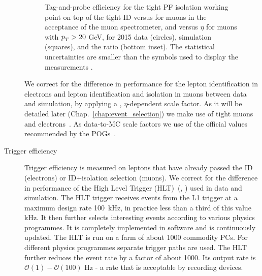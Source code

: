 \begin{description}
\begin{figure}[htp]
\centering
  \def\twidth{0.45}
  \centering
  \hfil
\caption{Tag-and-probe efficiency for the tight PF isolation working point on top of the tight ID versus \pt for muons in the acceptance of the muon spectrometer, and versus $\eta$ for muons with $p_{T}^{}> 20$ GeV, for 2015 data (circles), simulation (squares), and the ratio (bottom inset). The statistical uncertainties are smaller than the symbols used to display the measurements \cite{Sirunyan:2018fpa}.}
\label{fig:CMS-MUO-16-001_Figure_008}
\end{figure}

We correct for the difference in performance for the lepton identification in electrons and lepton identification and isolation in muons between data and simulation, by applying a \pt, $\eta$-dependent scale factor. As it will be detailed later (Chap.~\ref{chap:event_selection}) we make use of tight muons~\cite{twiki:MUO} and electrons~\cite{twiki:EGM}. As data-to-MC scale factors we use of the official values recommended by the POGs~\cite{twiki:MuonSF,twiki:EGMSF}.


\item[Trigger efficiency]

Trigger efficiency is measured on leptons that have already passed the ID (electrons) or ID+isolation selection (muons). We correct for the difference in performance of the High Level Trigger (HLT)~(\cite{Adam:2005zf}, \cite{Sphicas:2002gg}) used in data and simulation. The HLT trigger receives events from the L1 trigger at a maximum design rate 100~kHz, in practice less than a third of this value kHz. It then further selects interesting events according to various physics programmes. It is completely implemented in software and is continuously updated. The HLT is run on a farm of about 1000 commodity PCs. For different physics programmes separate trigger paths are used. The HLT further reduces the event rate by a factor of about 1000. Its output rate is $\mathcal{O}(1)-\mathcal{O}(100)$ Hz - a rate that is acceptable by recording devices.


\end{description}
